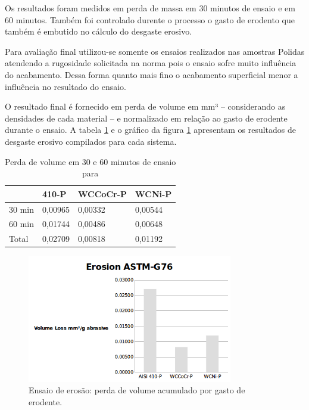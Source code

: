 Os resultados foram medidos em perda de massa em 30 minutos de ensaio e em 60
minutos. Também foi controlado durente o processo o gasto de erodento que
também é embutido no cálculo do desgaste erosivo.

Para avaliação final utilizou-se somente os ensaios realizados nas amostras
Polidas atendendo a rugosidade  solicitada na norma pois o ensaio sofre muito
influência do acabamento. Dessa forma quanto mais fino o acabamento superficial
menor a influência no resultado do ensaio.

O resultado final é fornecido em perda de volume em mm³ – considerando as
densidades de cada material – e normalizado em relação ao gasto de erodente
durante o ensaio. A tabela \ref{tab:perda_vol} e o gráfico da figura
\ref{fig:ensaio_erosao} apresentam os resultados de desgaste erosivo compilados
para cada sistema.


\begin{table}[H]
\centering

\begin{tabular}{llll}
         & 410-P   & WCCoCr-P & WCNi-P  \\ \hline
 30 min  & 0,00965 & 0,00332  & 0,00544 \\ \hline
 60 min  & 0,01744 & 0,00486 &  0,00648  \\ \hline
 Total   & 0,02709 & 0,00818 &  0,01192   
\end{tabular}
\caption{Perda de volume em 30 e 60 minutos de ensaio para}
\label{tab:perda_vol}
\end{table}

\begin{figure}[h!]
\centering
\includegraphics[width=0.8\textwidth]{method/figs/ensaio_erosao}
\caption{Ensaio de erosão: perda de volume acumulado por gasto de erodente.}
\label{fig:ensaio_erosao}
\end{figure}


